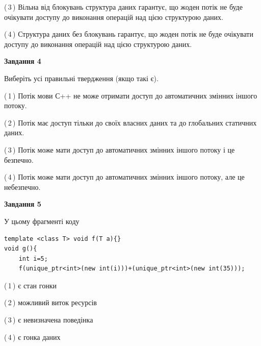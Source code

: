 \documentclass[12pt, ukrainian]{article}
\begin{document}
\begin {large}
{(\,3\,) Вільна від блокувань структура даних гарантує, що жоден потік не буде очікувати доступу до виконання операцій над цією структурою даних.%

(\,4\,) Структура даних без блокувань гарантує, що жоден потік не буде очікувати доступу до виконання операцій над цією структурою даних.%



\begin{center}
\textbf{Завдання 4}
\end{center}
Виберіть усі правильні твердження (якщо такі є).\par
\vspace{2mm}

(\,1\,) Потік мови С++ не може отримати доступ до автоматичних змінних іншого потоку.%

(\,2\,) Потік має доступ тільки до своїх власних даних та до глобальних статичних даних.%

(\,3\,) Потік може мати доступ до автоматичних змінних іншого потоку і це безпечно.%

(\,4\,) Потік може мати доступ до автоматичних змінних іншого потоку, але це небезпечно.%



\begin{center}
\textbf{Завдання 5}
\end{center}
У цьому фрагменті коду
\begin{verbatim}
template <class T> void f(T a){}
void g(){
    int i=5;
    f(unique_ptr<int>(new int(i)))+(unique_ptr<int>(new int(35)));
\end{verbatim}
(\,1\,) є стан гонки%

(\,2\,) можливий виток ресурсів%

(\,3\,) є невизначена поведінка%

(\,4\,) є гонка даних%


}
\end {large}
\end{document}
